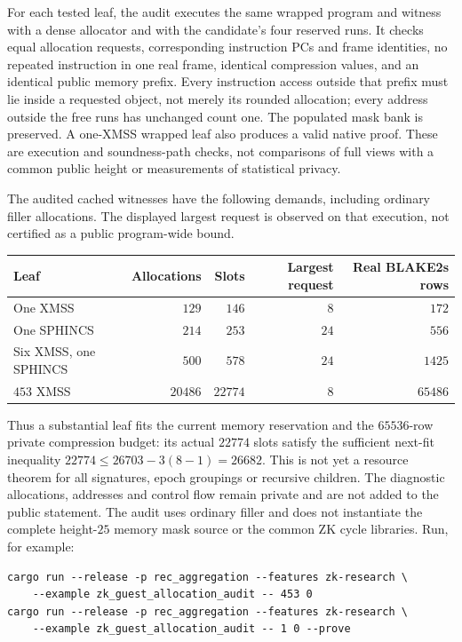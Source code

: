 For each tested leaf, the audit executes the same wrapped program and witness with a dense allocator and with the candidate's four reserved runs. It checks equal allocation requests, corresponding instruction PCs and frame identities, no repeated instruction in one real frame, identical compression values, and an identical public memory prefix. Every instruction access outside that prefix must lie inside a requested object, not merely its rounded allocation; every address outside the free runs has unchanged count one. The populated mask bank is preserved. A one-XMSS wrapped leaf also produces a valid native proof. These are execution and soundness-path checks, not comparisons of full views with a common public height or measurements of statistical privacy.

The audited cached witnesses have the following demands, including ordinary filler allocations. The displayed largest request is observed on that execution, not certified as a public program-wide bound.
\begin{center}
\begin{tabular}{lrrrr}
Leaf & Allocations & Slots & Largest request & Real BLAKE2s rows \\
\hline
One XMSS & $129$ & $146$ & $8$ & $172$ \\
One SPHINCS & $214$ & $253$ & $24$ & $556$ \\
Six XMSS, one SPHINCS & $500$ & $578$ & $24$ & $1425$ \\
$453$ XMSS & $20486$ & $22774$ & $8$ & $65486$
\end{tabular}
\end{center}
Thus a substantial leaf fits the current memory reservation and the $65536$-row private compression budget: its actual $22774$ slots satisfy the sufficient next-fit inequality $22774\le26703-3(8-1)=26682$. This is not yet a resource theorem for all signatures, epoch groupings or recursive children. The diagnostic allocations, addresses and control flow remain private and are not added to the public statement. The audit uses ordinary filler and does not instantiate the complete height-$25$ memory mask source or the common ZK cycle libraries. Run, for example:
\begin{verbatim}
cargo run --release -p rec_aggregation --features zk-research \
    --example zk_guest_allocation_audit -- 453 0
cargo run --release -p rec_aggregation --features zk-research \
    --example zk_guest_allocation_audit -- 1 0 --prove
\end{verbatim}

